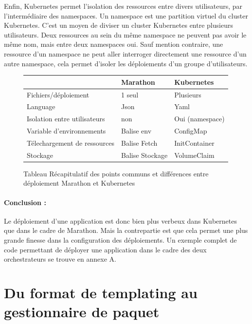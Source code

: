 \documentclass[11pt,fleqn]{book} %
\begin{document}
Enfin, Kubernetes permet l'isolation des ressources entre divers utilisateurs, par l'intermédiaire des namespaces. Un namespace est une partition virtuel du cluster Kubernetes. C’est un moyen de diviser un cluster Kubernetes entre plusieurs utilisateurs. Deux ressources au sein du même namespace ne peuvent pas avoir le même nom, mais entre deux namespaces oui. Sauf mention contraire, une ressource d’un namespace ne peut aller interroger directement une ressource d’un autre namespace, cela permet d’isoler les déploiements d’un groupe d’utilisateurs.

\begin{figure}[H]\centering
\begin{tabular}{@{}lll@{}}
\toprule
                             & Marathon       & Kubernetes      \\ \midrule
Fichiers/déploiement         & 1 seul         & Plusieurs       \\
Language                     & Json           & Yaml            \\
Isolation entre utilisateurs & non            & Oui (namespace) \\
Variable d'environnements    & Balise env     & ConfigMap       \\
Télechargement de ressources & Balise Fetch   & InitContainer   \\
Stockage                     & Balise Stockage & VolumeClaim     \\ \bottomrule
\end{tabular}
\caption{Tableau Récapitulatif des points communs et différences entre déploiement Marathon et Kubernetes}
\label{tab:my-table}
\end{figure}


\begin{interrupt}
\paragraph{Conclusion :}
Le déploiement d'une application est donc bien plus verbeux dans Kubernetes que dans le cadre de Marathon. Mais la contrepartie est que cela permet une plus grande finesse dans la configuration des déploiements. Un exemple complet de code permettant de déployer une application dans le cadre des deux orchestrateurs se trouve en annexe A.
\end{interrupt}

\section{Du format de templating au gestionnaire de paquet}
\end{document}

